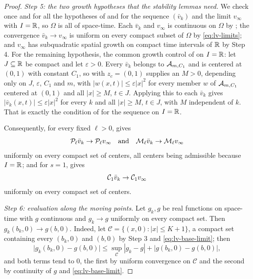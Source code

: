 \begin{proof}
\emph{Step 5: the two growth hypotheses that the stability lemmas need.}
We check once and for all the hypotheses of  and
 for the sequence $(\bar v_k)$ and the limit
$v_\infty$ with $I=\mathbb{R}$, so $\Omega$ is all of space-time. Each $\bar v_k$ and
$v_\infty$ is continuous on $\Omega$ by ; the convergence
$\bar v_k\to v_\infty$ is uniform on every compact subset of $\Omega$ by
\eqref{eq:lv-limits}; and $v_\infty$ has subquadratic spatial growth on compact
time intervals of $\mathbb{R}$ by Step 4. For the remaining hypothesis, the common
growth control of  on $I=\mathbb{R}$: let
$J\subseteq\mathbb{R}$ be compact and let $\varepsilon>0$. Every $\bar v_k$ belongs to
$\mathcal{A}_{m,C_1}$ and is centered at $(0,1)$ with constant $C_1$, so
 with $z_c=(0,1)$ supplies an $M>0$, depending only
on $J$, $\varepsilon$, $C_1$ and $m$, with $|w(x,t)|\le\varepsilon|x|^2$ for
every member $w$ of $\mathcal{A}_{m,C_1}$ centered at $(0,1)$ and all $|x|\ge M$,
$t\in J$. Applying this to each $\bar v_k$ gives
$|\bar v_k(x,t)|\le\varepsilon|x|^2$ for every $k$ and all $|x|\ge M$, $t\in J$,
with $M$ independent of $k$. That is exactly the condition of
 for the sequence on $I=\mathbb{R}$.

Consequently, for every fixed $\ell>0$,  gives
\begin{equation}\label{eq:lv-env-stability}
  \mathcal{P}_\ell\bar v_k\to\mathcal{P}_\ell v_\infty\quad\text{and}\quad
  \mathcal{M}_\ell\bar v_k\to\mathcal{M}_\ell v_\infty
\end{equation}
uniformly on every compact set of centers, all centers being admissible because
$I=\mathbb{R}$; and for $s=1$,  gives
\begin{equation}\label{eq:lv-bary-stability}
  \mathcal{C}_1\bar v_k\to\mathcal{C}_1v_\infty
\end{equation}
uniformly on every compact set of centers.

\emph{Step 6: evaluation along the moving points.}
Let $g_k,g$ be real functions on space-time with $g$ continuous and $g_k\to g$
uniformly on every compact set. Then $g_k(b_k,0)\to g(b,0)$. Indeed, let
$\mathcal C=\{(x,0):|x|\le K+1\}$, a compact set containing every $(b_k,0)$ and
$(b,0)$ by Step 3 and \eqref{eq:lv-base-limit}; then
\[
  \bigl|g_k(b_k,0)-g(b,0)\bigr|
   \le\sup_{\mathcal C}|g_k-g|+\bigl|g(b_k,0)-g(b,0)\bigr|,
\]
and both terms tend to $0$, the first by uniform convergence on $\mathcal C$ and
the second by continuity of $g$ and \eqref{eq:lv-base-limit}.


\end{proof}

